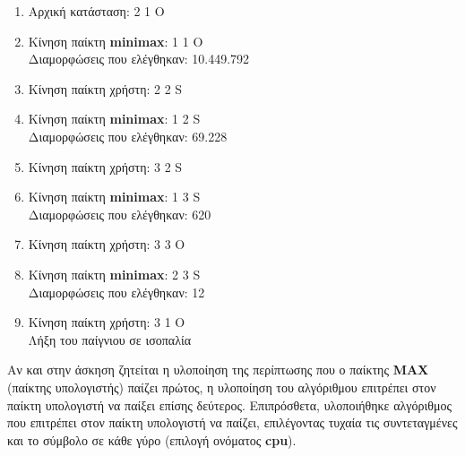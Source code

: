\documentclass{article}
\begin{document}
        \begin{enumerate}\addtocounter{enumi}{-1}
        	\centering
            \item Αρχική κατάσταση: 2 1 O
            \item Κίνηση παίκτη \textbf{minimax}: 1 1 O\\ Διαμορφώσεις που ελέγθηκαν: 10.449.792 
            \item Κίνηση παίκτη χρήστη: 2 2 S
            \item Κίνηση παίκτη \textbf{minimax}: 1 2 S\\ Διαμορφώσεις που ελέγθηκαν: 69.228
            \item Κίνηση παίκτη χρήστη: 3 2 S
            \item Κίνηση παίκτη \textbf{minimax}: 1 3 S\\ Διαμορφώσεις που ελέγθηκαν: 620 
            \item Κίνηση παίκτη χρήστη: 3 3 O
            \item Κίνηση παίκτη \textbf{minimax}: 2 3 S\\ Διαμορφώσεις που ελέγθηκαν: 12
            \item Κίνηση παίκτη χρήστη: 3 1 O\\Λήξη του παίγνιου σε ισοπαλία
        \end{enumerate}
        Αν και στην άσκηση ζητείται η υλοποίηση της περίπτωσης που ο παίκτης \textbf{MAX} (παίκτης υπολογιστής) παίζει 
        πρώτος, η υλοποίηση του αλγόριθμου επιτρέπει στον παίκτη υπολογιστή να παίξει επίσης δεύτερος. Επιπρόσθετα,
        υλοποιήθηκε αλγόριθμος που επιτρέπει στον παίκτη υπολογιστή να παίζει, επιλέγοντας τυχαία τις συντεταγμένες και το σύμβολο σε κάθε γύρο (επιλογή ονόματος \textbf{cpu}).
\end{document}
